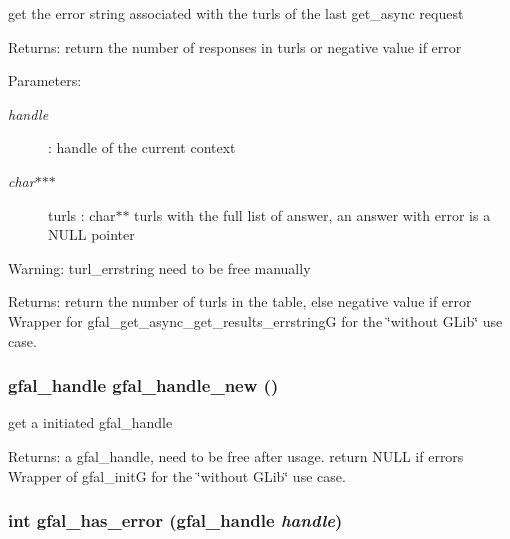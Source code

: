 get the error string associated with the turls of the last get\_\-async request \begin{Desc}
\item[Returns:]return the number of responses in turls or negative value if error \end{Desc}
\begin{Desc}
\item[Parameters:]
\begin{description}
\item[{\em handle}]: handle of the current context \item[{\em char$\ast$$\ast$$\ast$}]turls : char$\ast$$\ast$ turls with the full list of answer, an answer with error is a NULL pointer \end{description}
\end{Desc}
\begin{Desc}
\item[Warning:]turl\_\-errstring need to be free manually \end{Desc}
\begin{Desc}
\item[Returns:]return the number of turls in the table, else negative value if error Wrapper for gfal\_\-get\_\-async\_\-get\_\-results\_\-errstring\-G for the \char`\"{}without GLib\char`\"{} use case. \end{Desc}
\subsubsection{\setlength{\rightskip}{0pt plus 5cm}gfal\_\-handle gfal\_\-handle\_\-new ()}\label{gfal__common__interface_8c_4211faf02a3c5cc696c7c9f974415d11}


get a initiated gfal\_\-handle 

\begin{Desc}
\item[Returns:]a gfal\_\-handle, need to be free after usage. return NULL if errors Wrapper of gfal\_\-init\-G for the \char`\"{}without GLib\char`\"{} use case. \end{Desc}
\subsubsection{\setlength{\rightskip}{0pt plus 5cm}int gfal\_\-has\_\-error (gfal\_\-handle {\em handle})}\label{gfal__common__interface_8c_ad28f1c5d1a0ed623834e6133bb7dd2e}



